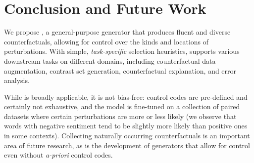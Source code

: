 \section{Conclusion and Future Work}
\label{sec:discuss}

We propose \sysname, a general-purpose generator that produces fluent and diverse counterfactuals, allowing for control over the kinds and locations of perturbations. 
With simple, \emph{task-specific} selection heuristics, \sysname supports various downstream tasks on different domains, including counterfactual data augmentation, contrast set generation, counterfactual explanation, and error analysis.

While \sysname is broadly applicable, it is not bias-free: control codes are pre-defined and certainly not exhaustive, and the model is fine-tuned on a collection of paired datasets where certain perturbations are more or less likely (\eg we observe that words with negative sentiment tend to be slightly more likely than positive ones in some contexts). 
Collecting naturally occurring counterfactuals is an important area of future research, as is the development of generators that allow for control even without \emph{a-priori} control codes.


